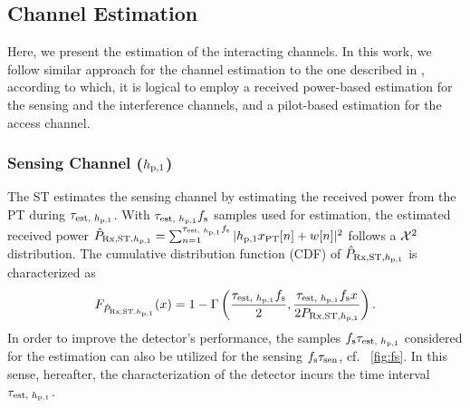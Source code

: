 \subsection{Channel Estimation}
Here, we present the estimation of the interacting channels. In this work, we follow similar approach for the channel estimation to the one described in \cite{Kaushik16, Kaushik16_CL}, according to which, it is logical to employ a received power-based estimation for the sensing and the interference channels, and a pilot-based estimation for the access channel.  
\subsubsection*{Sensing Channel ($h_{\text{p,1}}$)}
The ST estimates the sensing channel by estimating the received power from the PT during $\tau_{\text{est, $h_{\text{p,1}}$}}$. With $\tau_{\text{est, $h_{\text{p,1}}$}} f_{\text{s}}$ samples used for estimation, the estimated received power $\hat{P}_{\text{Rx,ST,$h_{\text{p,1}}$}} = \sum_{n = 1}^{\tau_{\text{est, $h_{\text{p,1}}$}} f_{\text{s}}} |h_{\text{p,1}} x_{\text{PT}}[n] + w[n]|^2$ follows a $\cchi2$ distribution.
The cumulative distribution function (CDF) of $\hat{P}_{\text{Rx,ST,$h_{\text{p,1}}$}}$ is characterized as
\begin{align}
\feprcvdstpt(x) = 1 - \Gamma \left( \frac{\testpt \fsam}{2}, \frac{\testpt \fsam x}{2 \prcvdstpt} \right) \label{eq:fprcvdstpt}.
\end{align}
In order to improve the detector's performance, the samples $f_{\text{s}} \tau_{\text{est, $h_{\text{p,1}}$}}$ considered for the estimation can also be utilized for the sensing $f_{\text{s}} \tau_{\text{sen}}$, cf. \figurename~\ref{fig:fs}. In this sense, hereafter, the characterization of the detector incurs the time interval $\tau_{\text{est, $h_{\text{p,1}}$}}$. 
  
